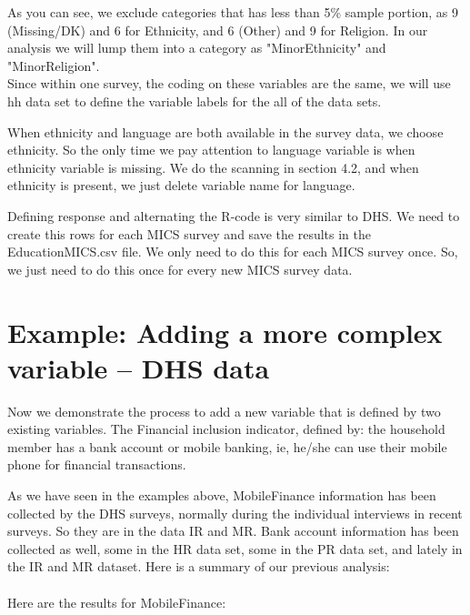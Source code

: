 \documentclass[12pt]{article}
\begin{document}
As you can see, we exclude categories that has less than 5\% sample portion, as 9 (Missing/DK) and 6 for Ethnicity, and 6 (Other) and 9 for Religion. In our analysis we will lump them into a category as "MinorEthnicity" and "MinorReligion". \\


Since within one survey, the coding on these variables are the same, we will use hh data set to define the variable labels for the all of the data sets. 

When ethnicity and language are both available  in the survey data, we choose ethnicity. So the only time we pay attention to language variable is when ethnicity variable is missing. We do the scanning in section 4.2, and when ethnicity is present, we just delete variable name for language.

\hfill \break
Defining response and alternating the R-code is very similar to DHS.  
We need to create this rows for each MICS survey and save the results in the EducationMICS.csv file. We only need to do this for each MICS survey once. So, we just need to do this once for every new MICS survey data.

\section{Example: Adding a more complex variable -- DHS data}
Now we demonstrate the process to add a new variable that is defined by two existing variables.
The Financial inclusion indicator, defined by: the household member has a bank account or mobile banking, ie, he/she can use their mobile phone for financial transactions.

As we have seen in the examples above, MobileFinance information has been collected by the DHS surveys, normally during the individual interviews in recent surveys. So they are in the data IR and MR. Bank account information has been collected as well, some in the HR data set, some in the PR data set, and lately in the IR and MR dataset.
Here is a summary of our previous analysis:
\\
\\
Here are the results for MobileFinance:
\end{document}
